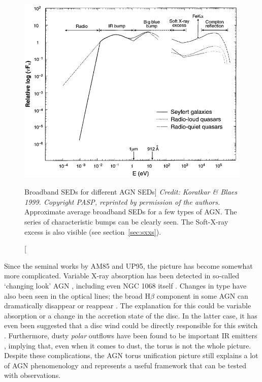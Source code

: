 \nocite{elvis1994}
\begin{figure}
\centering
\includegraphics[width=1.0\textwidth]{figures/01-intro/agn_sed.png}
\caption
[Broadband SEDs for different AGN SEDs]
{
{\sl Credit: Koratkar \& Blaes 1999. 
Copyright PASP, reprinted by permission of the authors.}
Approximate average broadband SEDs for a few types of AGN. The series of 
characteristic bumps can be clearly seen. 
The Soft-X-ray excess is also visible
(see section~\ref{sec:sxxs}).
} 
\label{fig:quasar_sed}
\end{figure}

Since the seminal works by AM85 and UP95, 
the picture has become somewhat more complicated. 
Variable X-ray absorption has been detected in so-called `changing look'
AGN \citep{matt2003,puccetti2007},
including even NGC 1068 itself \citep{marinucci2016}.
Changes in type have also been seen in the optical lines;
the broad H$\beta$ component in some AGN can dramatically disappear or reappear
\citep[e.g.][]{tohline1976,cohen1986,denney2014}. 
The explanation for this could be variable absorption \citep{elitzur2012}
or a change in the accretion state of the disc. In the latter case,
it has even been suggested that a disc wind could be directly responsible
for this switch \citep{elitzur2014}.
 Furthermore, dusty {\em polar} outflows
have been found to be important IR emitters \citep{hoenig2013}, implying
that, even when it comes to dust, the torus is not the whole picture.
Despite these complications, the AGN torus unification picture still
explains a lot of AGN phenomenology and represents a useful framework 
that can be tested with observations. 



